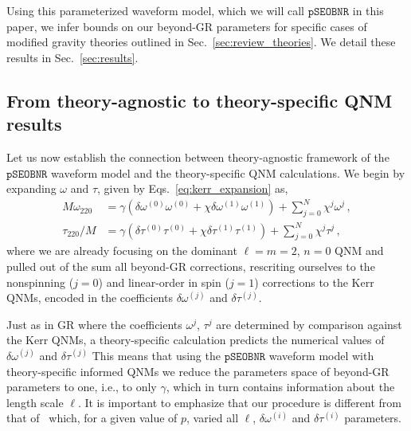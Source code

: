 \documentclass[twocolumn,prd,aps,superscriptaddress,preprintnumbers,tightenlines,showpacs,nofootinbib,eqsecnum,amsfonts,amsmath,longbibliography]{revtex4-1}
\newcommand{\pSEOB}{\texttt{pSEOBNR}}
\begin{document}
Using this parameterized waveform model, which we will call $\pSEOB$ in this paper, we infer bounds on our beyond-GR parameters for specific cases of modified gravity theories outlined in Sec.~\ref{sec:review_theories}. We detail these results in Sec.~\ref{sec:results}.
%
%



\subsection{From theory-agnostic to theory-specific QNM results}
\label{sec:theory_specific_qnm}

Let us now establish the connection between theory-agnostic framework of the
$\pSEOB$ waveform model and the theory-specific QNM calculations.
%
We begin by expanding $\omega$ and $\tau$, given by Eqs.~\eqref{eq:kerr_expansion} as,
%
\begin{subequations}
\begin{align}
M \omega_{220} &= \gamma \left( \delta\omega^{(0)} \omega^{(0)} + \chi \delta\omega^{(1)} \omega^{(1)} \right)
+ \sum_{j=0}^{N} \chi^{j} \omega^{j}\,,
\\
\tau_{220}/M   &= \gamma \left( \delta\tau^{(0)} \tau^{(0)} + \chi \delta\tau^{(1)} \tau^{(1)} \right)
+ \sum_{j=0}^{N} \chi^{j} \tau^{j}\,,
\end{align}
\label{eq:qnm_nongr_iso}
\end{subequations}
%
where we are already focusing on the dominant $\ell = m = 2$, $n=0$ QNM and
pulled out of the sum all beyond-GR corrections, rescriting ourselves to the nonspinning ($j=0$) and linear-order in spin ($j=1$)
corrections to the Kerr QNMs, encoded in the coefficients $\delta\omega^{(j)}$ and $\delta\tau^{(j)}$.

Just as in GR where the coefficients $\omega^{j}$, $\tau^{j}$ are determined by
comparison against the Kerr QNMs, a theory-specific calculation predicts the
numerical values of $\delta\omega^{(j)}$ and $\delta\tau^{(j)}$
%
This means that using the $\pSEOB$ waveform model with theory-specific informed
QNMs we reduce the parameters space of beyond-GR parameters to one, i.e., to
only $\gamma$, which in turn contains information about the length scale $\ell$.
%
It is important to emphasize that our procedure is different from that of~\cite{Carullo:2021dui}
which, for a given value of $p$, varied all $\ell$, $\delta\omega^{(i)}$ and $\delta\tau^{(i)}$ parameters.
%
\end{document}
